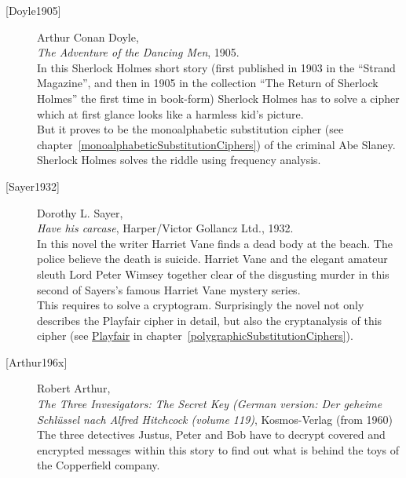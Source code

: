 \begin{description}
\item[\textrm{[Doyle1905]}] 
    Arthur Conan Doyle, \\
    {\em The Adventure of the Dancing Men}, 1905. \\
    In this Sherlock Holmes short story (first published in 1903 in the
    ``Strand Magazine'', and then in 1905 in the collection 
    ``The Return of Sherlock Holmes'' the first time in book-form)
    Sherlock Holmes has to solve a cipher which at first glance looks
    like a harmless kid's picture. \\
    But it proves to be the monoalphabetic substitution cipher (see
    chapter~\ref{monoalphabeticSubstitutionCiphers}) of the criminal Abe
    Slaney.
    Sherlock Holmes solves the riddle using frequency analysis.\\


\item[\textrm{[Sayer1932]}] 
    Dorothy L. Sayer, \\
    {\em Have his carcase}, Harper/Victor Gollancz Ltd., 1932. \\
    In this novel the writer Harriet Vane finds a dead body at the beach.
    The police believe the death is suicide.
    Harriet Vane and the elegant amateur sleuth Lord Peter Wimsey together
    clear of the disgusting murder in this second of Sayers's famous
    Harriet Vane mystery series. \\
    This requires to solve a cryptogram. Surprisingly the novel not only
    describes the Playfair cipher in detail, but also the cryptanalysis
    of this cipher
    (see \hyperlink{playfair}{Playfair} in 
    chapter~\ref{polygraphicSubstitutionCiphers}).\\


\item[\textrm{[Arthur196x]}] 
    Robert Arthur, \\
    {\em The Three Invesigators: The Secret Key (German version: Der
    geheime Schl\"ussel nach Alfred Hitchcock (volume 119)},
    Kosmos-Verlag (from 1960) \\
    The three detectives Justus, Peter and Bob have to decrypt covered and
    encrypted messages within this story to find out what is behind the toys
    of the Copperfield company.\\



\end{description}
